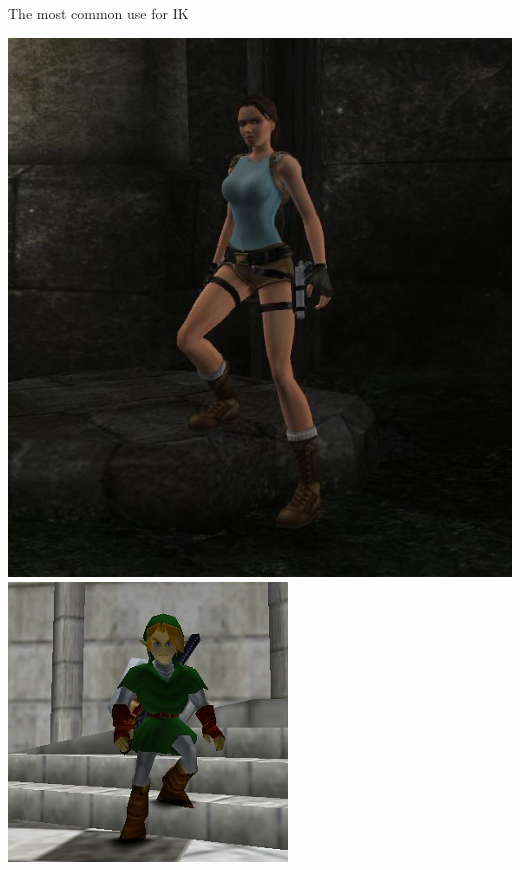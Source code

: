 \begin{frame}{The most common use for IK}
	\begin{center}
		\includegraphics[height=0.4\textheight]{ik_feet3} \quad
		\includegraphics[height=0.4\textheight]{ik_feet2}
		

\end{center}
\end{frame}
